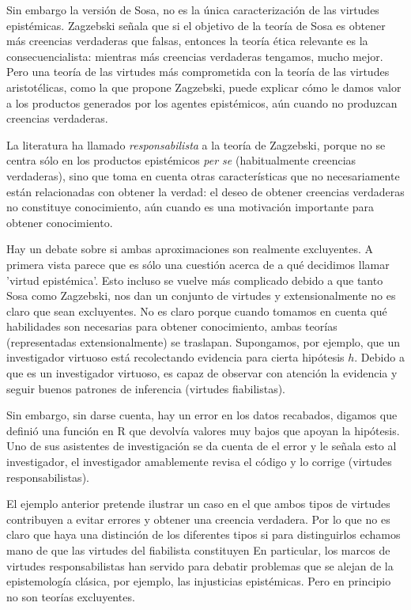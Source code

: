 {{{{Sin embargo la versión de Sosa, no es la única caracterización de las virtudes epistémicas.
Zagzebski señala que si el objetivo de la teoría de Sosa es obtener más creencias verdaderas que falsas, entonces la teoría ética relevante es la consecuencialista: mientras más creencias verdaderas tengamos, mucho mejor.
Pero una teoría de las virtudes más comprometida con la teoría de las virtudes aristotélicas, como la que propone Zagzebski, puede explicar cómo le damos valor a los productos generados por los agentes epistémicos, aún cuando no produzcan creencias verdaderas.

La literatura ha llamado \emph{responsabilista} a la teoría de Zagzebski, porque no se centra sólo en los productos epistémicos \textit{per se} (habitualmente creencias verdaderas), sino que toma en cuenta otras características que no necesariamente están relacionadas con obtener la verdad: el deseo de obtener creencias verdaderas no constituye conocimiento, aún cuando es una motivación importante para obtener conocimiento.

Hay un debate sobre si ambas aproximaciones son realmente excluyentes.
A primera vista parece que es sólo una cuestión acerca de a qué decidimos llamar 'virtud epistémica'.
Esto incluso se vuelve más complicado debido a que tanto Sosa como Zagzebski, nos dan un conjunto de virtudes y extensionalmente no es claro que sean excluyentes.
No es claro porque cuando tomamos en cuenta qué habilidades son necesarias para obtener conocimiento, ambas teorías (representadas extensionalmente) se traslapan.
Supongamos, por ejemplo, que un investigador virtuoso está recolectando evidencia para cierta hipótesis $h$.
Debido a que es un investigador virtuoso, es capaz de observar con atención la evidencia y seguir buenos patrones de inferencia (virtudes fiabilistas).

Sin embargo, sin darse cuenta, hay un error en los datos recabados, digamos que definió una función en R que devolvía valores muy bajos que apoyan la hipótesis. Uno de sus asistentes de investigación se da cuenta de el error y le señala esto al investigador, el investigador amablemente revisa el código y lo corrige (virtudes responsabilistas).

El ejemplo anterior pretende ilustrar un caso en el que ambos tipos de virtudes contribuyen a evitar errores y obtener una creencia verdadera.
Por lo que no es claro que haya una distinción de los diferentes tipos si para distinguirlos echamos mano de que las virtudes del fiabilista constituyen %
En particular, los marcos de virtudes responsabilistas han servido para debatir problemas que se alejan de la epistemología clásica, por ejemplo, las injusticias epistémicas.
Pero en principio no son teorías excluyentes.


}}}}
